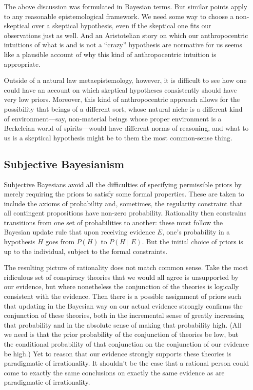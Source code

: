 The above discussion was formulated in Bayesian terms. But similar points apply to any reasonable epistemological framework.
We need some way to choose a non-skeptical over a skeptical hypothesis, even if the skeptical one fits our observations just 
as well. And an Aristotelian story on which our anthropocentric intuitions of what is and is not a ``crazy'' hypothesis 
are normative for us seems like a plausible account of why this kind of anthropocentric intuition is appropriate.

Outside of a natural law metaepistemology, however, it is difficult to see how one could have an account on which
skeptical hypotheses consistently should have very low priors. Moreover, this kind of anthropocentric approach 
allows for the possibility that beings of a different sort, whose natural niche is a different kind of 
environment---say, non-material beings whose proper environment is a Berkeleian world of spirits---would have
different norms of reasoning, and what to us is a skeptical hypothesis might be to them the most common-sense thing.

\subsection{Subjective Bayesianism}
Subjective Bayesians avoid all the difficulties of specifying permissible priors by merely
requiring the priors to satisfy some formal properties. These are taken to include the
axioms of probability and, sometimes, the regularity constraint that all contingent 
propositions have non-zero probability. Rationality then constrains transitions from one
set of probabilities to another: these must follow the Bayesian update rule that upon
receiving evidence $E$, one's probability in a hypothesis $H$ goes from $P(H)$ to 
$P(H\mid E)$. But the initial choice of priors is up to the individual, subject to the
formal constraints.

The resulting picture of rationality does not match common sense. Take the most
ridiculous set of conspiracy theories that we would all agree is unsupported by our evidence, 
but where nonetheless the conjunction of the theories is logically consistent with the evidence.
Then there is a possible assignment of priors such that updating in the Bayesian way on our actual 
evidence strongly confirms the conjunction of these theories, both in the incremental sense of 
greatly increasing that probability and in the absolute sense of making that probability high. (All 
we need is that the prior probability of the conjunction of theories be low, but the conditional
probability of that conjunction on the conjunction of our evidence be high.) Yet to reason that
our evidence strongly supports these theories is paradigmatic of irrationality. It shouldn't be the
case that a rational person could come to exactly the same conclusions on exactly the same evidence
as are paradigmatic of irrationality.

